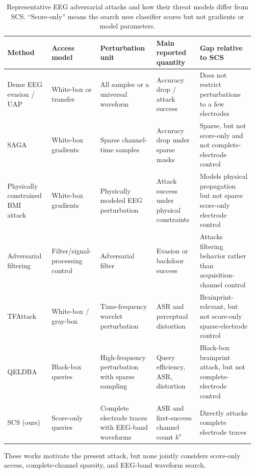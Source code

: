 \documentclass[journal]{IEEEtran}
\begin{document}
\begin{table}[t]
\centering
\caption{Representative EEG adversarial attacks and how their threat models differ from SCS. ``Score-only'' means the search uses classifier scores but not gradients or model parameters.}
\label{tab:eeg_attack_landscape}
\scriptsize
\setlength{\tabcolsep}{2pt}
\begin{tabular}{p{}p{}p{}p{}p{}}
\hline
Method & Access model & Perturbation unit & Main reported quantity & Gap relative to SCS \\
\hline
Dense EEG evasion / UAP~\cite{zhang2021tiny,liu2021uap} & White-box or transfer & All samples or a universal waveform & Accuracy drop / attack success & Does not restrict perturbations to a few electrodes \\
SAGA~\cite{feng2021saga} & White-box gradients & Sparse channel-time samples & Accuracy drop under sparse masks & Sparse, but not score-only and not complete-electrode control \\
Physically constrained BMI attack~\cite{wang2022physical} & White-box gradients & Physically modeled EEG perturbation & Attack success under physical constraints & Models physical propagation but not sparse score-only electrode control \\
Adversarial filtering~\cite{meng2024adversarialfilter} & Filter/signal-processing control & Adversarial filter & Evasion or backdoor success & Attacks filtering behavior rather than acquisition-channel control \\
TFAttack~\cite{yi2024tfattack} & White-box / gray-box & Time-frequency wavelet perturbation & ASR and perceptual distortion & Brainprint-relevant, but not score-only sparse-electrode control \\
QELDBA~\cite{qian2025qeldba} & Black-box queries & High-frequency perturbation with sparse sampling & Query efficiency, ASR, distortion & Black-box brainprint attack, but not complete-electrode control \\
SCS (ours) & Score-only queries & Complete electrode traces with EEG-band waveforms & ASR and first-success channel count $k^\star$ & Directly attacks complete electrode traces \\
\hline
\end{tabular}
\end{table}

These works motivate the present attack, but none jointly considers score-only access, complete-channel sparsity, and EEG-band waveform search.
\end{document}
